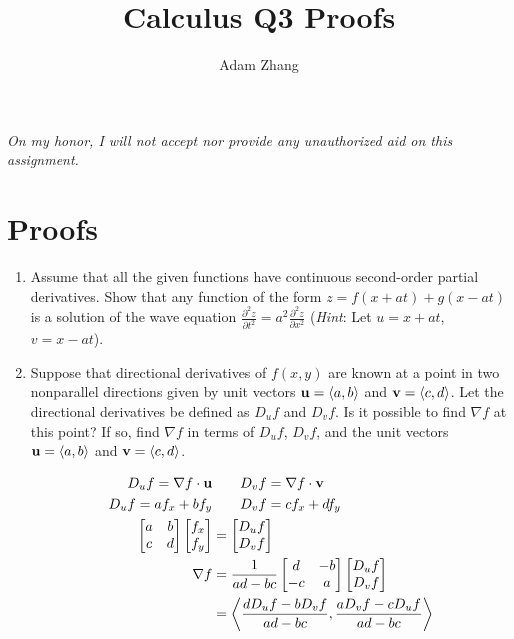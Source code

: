 \documentclass[11pt]{article}
\title{Calculus Q3 Proofs}
\author{Adam Zhang}
\renewcommand{\vec}[1]{\ensuremath\mathbf{#1}}
\begin{document}
\pagestyle{fancy}

\begin{center}
  \emph{On my honor, I will not accept nor provide any unauthorized aid on this assignment.}
\end{center}

\section*{Proofs}
\begin{enumerate}
\item Assume that all the given functions have continuous second-order partial
  derivatives. Show that any function of the form \(z = f(x + at) + g(x - at) \)
  is a solution of the wave equation \(\frac{\partial^2 z}{\partial t^2} = a^2
  \frac{\partial^2 z}{\partial x^2}\) (\textit{Hint}: Let \( u = x + at \), \( v
  = x - at \)).

\item Suppose that directional derivatives of \(f(x,y)\) are known at a point in two nonparallel directions given by unit vectors \(\vec{u} = \langle a, b \rangle\) and \(\vec{v} = \langle c, d \rangle\). Let the directional derivatives be defined as \(D_{u} f\) and \(D_{v} f\). Is it possible to find \( \nabla f \) at this point? If so, find \( \nabla f \) in terms of \( D_{u} f \), \( D_{v} f \), and the unit vectors \(\vec{u} = \langle a, b \rangle\) and \(\vec{v} = \langle c, d \rangle\).

  \begin{align*}
    D_uf = \nabla f \cdot \vec{u} &\qquad D_vf = \nabla f \cdot \vec{v} \\
    D_uf = a f_x + b f_y &\qquad D_vf = c f_x + d f_y \\
    \begin{bmatrix}
      a & b \\
      c & d \\
    \end{bmatrix}
    \begin{bmatrix}
      f_x \\ f_y
    \end{bmatrix}
    &=
      \begin{bmatrix}
        D_uf \\ D_v f
      \end{bmatrix} \\
    \nabla f
    &=
      \frac{1}{ad - bc}
      \begin{bmatrix}
        d & -b \\
        -c & a \\
      \end{bmatrix}
      \begin{bmatrix}
        D_uf \\ D_v f
      \end{bmatrix} \\
    &= \left< \frac{d D_uf - b D_vf}{ad - bc}, \frac{a D_vf - c D_uf}{ad - bc} \right>
  \end{align*}


\end{enumerate}
\end{document}
